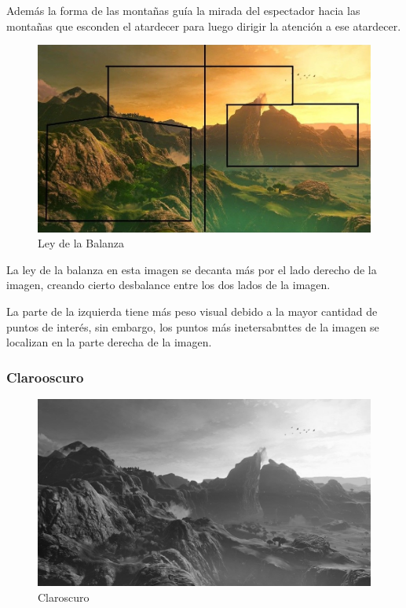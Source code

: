 \documentclass[12pt]{article}
\begin{document}
            Además la forma de las montañas guía la mirada del espectador hacia las montañas que esconden el atardecer para luego dirigir la atención a ese atardecer. 
          
          \begin{figure}[H]
            \centering
            \includegraphics[scale = 0.5]{Jesus/Seccion16/Fondo6.JPEG}
            \caption{Ley de la Balanza}
          \end{figure}
            La ley de la balanza en esta imagen se decanta más por el lado derecho de la imagen, creando cierto desbalance entre los dos lados de la imagen. 
            
            La parte de la izquierda tiene más peso visual debido a la mayor cantidad de puntos de interés, sin embargo, los puntos más inetersabnttes de la imagen se localizan en la parte derecha de la imagen. 
      
        \subsubsection{Clarooscuro}
          \begin{figure}[H]
            \centering
            \includegraphics[scale = 0.2]{Jesus/Seccion16/claroscuro.jpg}
            \caption{Claroscuro}
          \end{figure}
\end{document}
